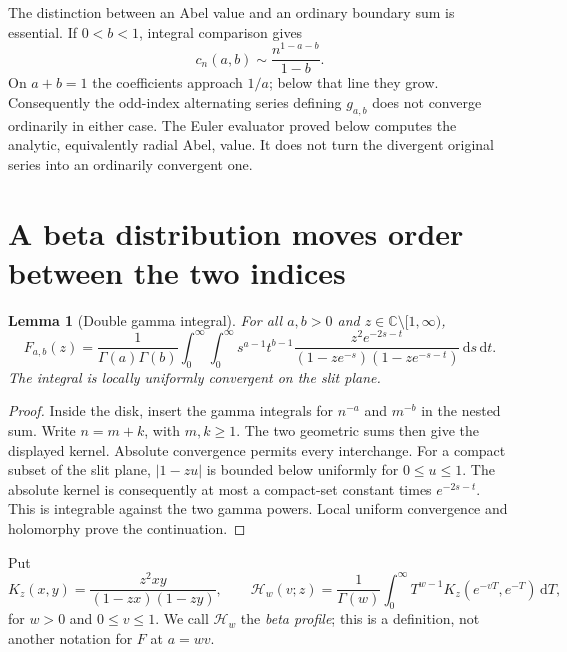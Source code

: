 \documentclass[11pt]{article}
\numberwithin{equation}{section}
\newtheorem{lemma}[theorem]{Lemma}
\theoremstyle{definition}\newtheorem{definition}[theorem]{Definition}
\theoremstyle{remark}\newtheorem{remark}[theorem]{Remark}
\newcommand{\dd}{\,\mathrm d}
\newcommand{\C}{\mathbb C}
\newcommand{\cut}{\C\setminus[1,\infty)}
\newcommand{\HH}{\mathcal H}
\begin{document}
The distinction between an Abel value and an ordinary boundary sum is
essential. If $0<b<1$, integral comparison gives
\begin{equation}\label{eq:coefficientgrowth}
 c_n(a,b)\sim\frac{n^{1-a-b}}{1-b}.
\end{equation}
On $a+b=1$ the coefficients approach $1/a$; below that line they grow.
Consequently the odd-index alternating series defining $g_{a,b}$ does
not converge ordinarily in either case. The Euler evaluator proved
below computes the analytic, equivalently radial Abel, value. It does
not turn the divergent original series into an ordinarily convergent
one.

\section{A beta distribution moves order between the two indices}
\label{sec:beta}

\begin{lemma}[Double gamma integral]\label{lem:double}
For all $a,b>0$ and $z\in\cut$,
\begin{equation}\label{eq:double}
 F_{a,b}(z)=\frac1{\Gamma(a)\Gamma(b)}
 \int_0^\infty\!\int_0^\infty
 s^{a-1}t^{b-1}
 \frac{z^2e^{-2s-t}}
 {(1-ze^{-s})(1-ze^{-s-t})}\dd s\dd t.
\end{equation}
The integral is locally uniformly convergent on the slit plane.
\end{lemma}
\begin{proof}
Inside the disk, insert the gamma integrals for $n^{-a}$ and $m^{-b}$
in the nested sum. Write $n=m+k$, with $m,k\ge1$. The two geometric sums
then give the displayed kernel. Absolute convergence permits every
interchange. For a compact subset of the slit plane,
$|1-zu|$ is bounded below uniformly for $0\le u\le1$. The absolute
kernel is consequently at most a compact-set constant times
$e^{-2s-t}$. This is integrable against the two gamma powers.
Local uniform convergence and holomorphy prove the continuation.
\end{proof}

Put
\begin{equation}\label{eq:kernel}
 K_z(x,y)=\frac{z^2xy}{(1-zx)(1-zy)},\qquad
 \HH_w(v;z)=\frac1{\Gamma(w)}\int_0^\infty
 T^{w-1}K_z(e^{-vT},e^{-T})\dd T,
\end{equation}
for $w>0$ and $0\le v\le1$. We call $\HH_w$ the \emph{beta profile};
this is a definition, not another notation for $F$ at $a=wv$.
\end{document}
